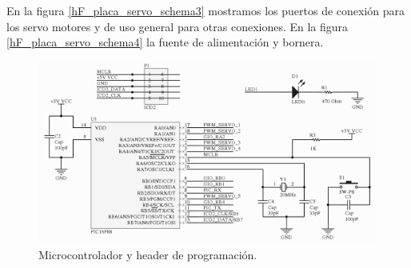 En la figura \ref{hF_placa_servo_schema3} mostramos los puertos de conexi\'on para los servo motores y de
uso general para otras conexiones.
En la figura \ref{hF_placa_servo_schema4} la fuente de alimentaci\'on y bornera.

\begin{figure}
	\centering
	\includegraphics[scale=.22]{figuras/servo_schemaMicro.png}
	\caption{Microcontrolador y header de programaci\'on.}
	\label{hF_placa_servo_schema}
\end{figure}

